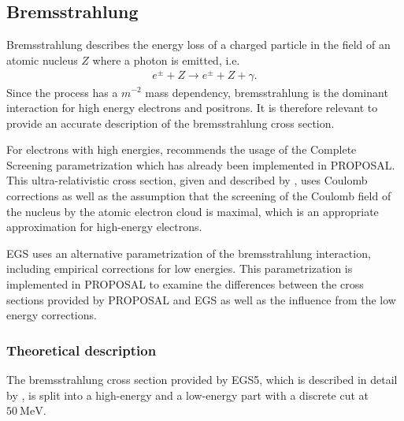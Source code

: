 \subsection{Bremsstrahlung}

Bremsstrahlung describes the energy loss of a charged particle in the field of an atomic nucleus $Z$ where a photon is emitted, i.e.\
%
\begin{align*}
	e^{\pm} + Z \rightarrow e^{\pm} + Z + \gamma.
\end{align*}
%
Since the process has a $m^{-2}$ mass dependency, bremsstrahlung is the dominant interaction for high energy electrons and positrons.
It is therefore relevant to provide an accurate description of the bremsstrahlung cross section.

For electrons with high energies, \cite{Kohne:2013zbq} recommends the usage of the Complete Screening parametrization which has already been implemented in PROPOSAL.
This ultra-relativistic cross section, given and described by \cite{RevModPhys.46.815}, uses Coulomb corrections as well as the assumption that the screening of the Coulomb field of the nucleus by the atomic electron cloud is maximal, which is an appropriate approximation for high-energy electrons.

EGS uses an alternative parametrization of the bremsstrahlung interaction, including empirical corrections for low energies.
This parametrization is implemented in PROPOSAL to examine the differences between the cross sections provided by PROPOSAL and EGS as well as the influence from the low energy corrections.

\subsubsection{Theoretical description}

The bremsstrahlung cross section provided by EGS5, which is described in detail by \cite{Hirayama:2005zm}, is split into a high-energy and a low-energy part with a discrete cut at $\SI{50}{\mega\electronvolt}$.

